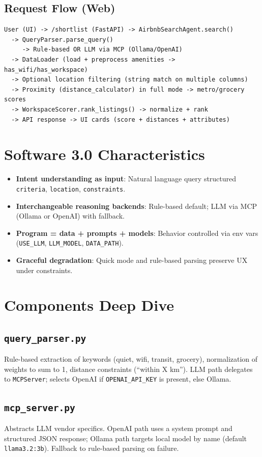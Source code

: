 \documentclass[11pt]{article}
\begin{document}
\subsection{Request Flow (Web)}
\begin{verbatim}
User (UI) -> /shortlist (FastAPI) -> AirbnbSearchAgent.search()
  -> QueryParser.parse_query()
     -> Rule-based OR LLM via MCP (Ollama/OpenAI)
  -> DataLoader (load + preprocess amenities -> has_wifi/has_workspace)
  -> Optional location filtering (string match on multiple columns)
  -> Proximity (distance_calculator) in full mode -> metro/grocery scores
  -> WorkspaceScorer.rank_listings() -> normalize + rank
  -> API response -> UI cards (score + distances + attributes)
\end{verbatim}

\section{Software 3.0 Characteristics}
\begin{itemize}
  \item \textbf{Intent understanding as input}: Natural language query \textrightarrow{} structured \texttt{criteria}, \texttt{location}, \texttt{constraints}.
  \item \textbf{Interchangeable reasoning backends}: Rule-based default; LLM via MCP (Ollama or OpenAI) with fallback.
  \item \textbf{Program = data + prompts + models}: Behavior controlled via env vars (\texttt{USE\_LLM}, \texttt{LLM\_MODEL}, \texttt{DATA\_PATH}).
  \item \textbf{Graceful degradation}: Quick mode and rule-based parsing preserve UX under constraints.
\end{itemize}

\section{Components Deep Dive}
\subsection{\texttt{query\_parser.py}}
Rule-based extraction of keywords (quiet, wifi, transit, grocery), normalization of weights to sum to 1, distance constraints (``within X km''). LLM path delegates to \texttt{MCPServer}; selects OpenAI if \texttt{OPENAI\_API\_KEY} is present, else Ollama.

\subsection{\texttt{mcp\_server.py}}
Abstracts LLM vendor specifics. OpenAI path uses a system prompt and structured JSON response; Ollama path targets local model by name (default \texttt{llama3.2:3b}). Fallback to rule-based parsing on failure.
\end{document}
